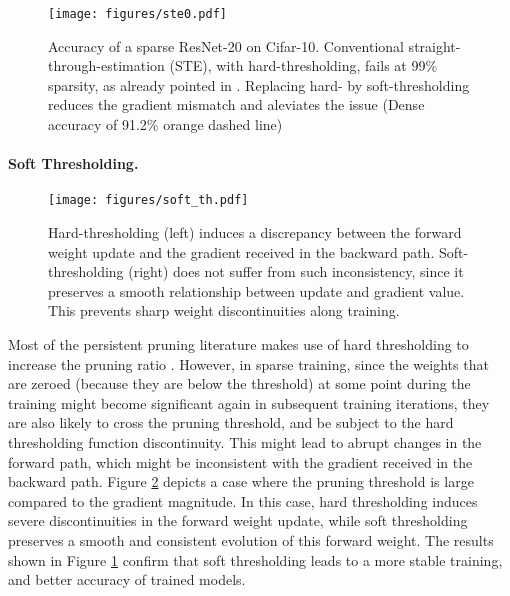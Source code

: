 \documentclass[10pt,twocolumn,letterpaper]{article}
\begin{document}
\begin{figure}[t]
  \centering
   \texttt{[image: figures/ste0.pdf]}
   \caption{Accuracy of a sparse ResNet-20 on Cifar-10. Conventional straight-through-estimation (STE), with hard-thresholding,  fails at 99\% sparsity, as already pointed in \cite{Tanaka2020}. Replacing hard- by soft-thresholding reduces the gradient mismatch and aleviates the issue (Dense accuracy of 91.2\% orange dashed line)}
   \label{fig:ste}
\end{figure}

\paragraph{Soft Thresholding.}
\begin{figure}[t]
  \centering
   \texttt{[image: figures/soft\_th.pdf]}
   \caption{Hard-thresholding (left) induces a discrepancy between the forward weight update and the gradient received in the backward path. Soft-thresholding (right) does not suffer from such inconsistency, since it preserves a smooth relationship between update and gradient value. This prevents sharp weight discontinuities along training.}
   \label{fig:soft}
\end{figure}
Most of the persistent pruning literature makes use of hard thresholding to increase the pruning ratio \cite{Han2015,Frankle2019,Evci2020}. However, in sparse training, since the weights that are zeroed (because they are below the threshold) at some point during the training might become significant again in subsequent training iterations, they are also likely to cross the pruning threshold, and be subject to the hard thresholding function discontinuity. This might lead to abrupt changes in the forward path, which might be inconsistent with the gradient received in the backward path. Figure \ref{fig:soft} depicts a case where the pruning threshold is large compared to the gradient magnitude.
In this case, hard thresholding induces severe discontinuities in the forward weight update, while soft thresholding preserves a smooth and consistent evolution of this forward weight. The results shown in Figure \ref{fig:ste} confirm that soft thresholding leads to a more stable training, and better accuracy of trained models.
\end{document}
